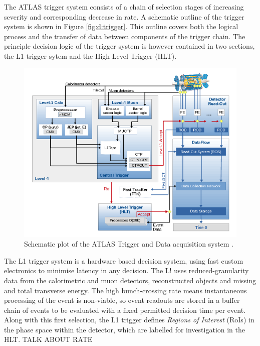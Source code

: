 	The ATLAS trigger system consists of a chain of selection stages of increasing severity and corresponding decrease in rate. A schematic outline of the trigger system is shown in Figure \ref{fig:d:trigger}. This outline covers both the logical process and the transfer of data between components of the trigger chain. The principle decision logic of the trigger system is however contained in two sections, the L1 trigger sytem and the High Level Trigger (HLT).
	
	\begin{figure}
		\centering
		\includegraphics[width=0.7\linewidth]{D/FIGS/trigschem}
		\caption{Schematic plot of the ATLAS Trigger and Data acquisition system \cite{trig2015}.}
		\label{fig:trigschem}
		\end{figure}
		
	The L1 trigger system \cite{L1} is a hardware based decision system, using fast custom electronics to minimise latency in any decision. The L! uses reduced-granularity data from the calorimetric and muon detectors, reconstructed objects and missing and total transverse energy. The high bunch-crossing rate means instantaneous processing of the event is non-viable, so event readouts are stored in a buffer chain of events to be evaluated with a fixed permitted decision time per event. Along with this first selection, the L1 trigger defines \textit{Regions of Interest} (RoIs) in the phase space within the detector, which are labelled for investigation in the HLT. TALK ABOUT RATE
	
